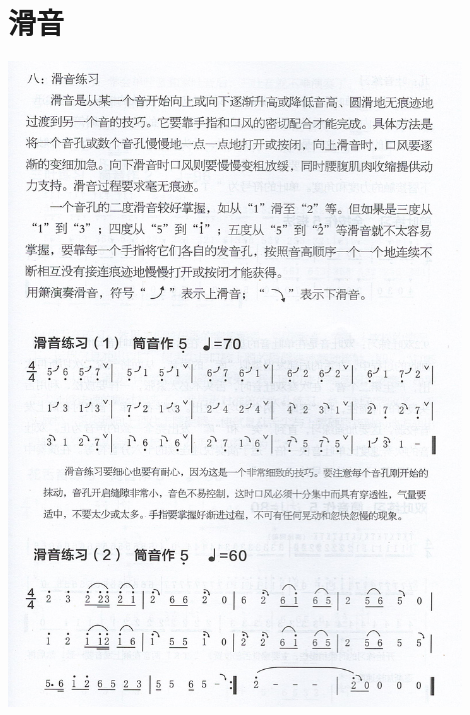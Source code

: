 \documentclass[cn,pad,twocol]{elegantbook}
\begin{document}
\section{滑音}
    \includegraphics[width=0.9\textwidth]{dongxiao/Scan 14.jpeg}
\end{document}
